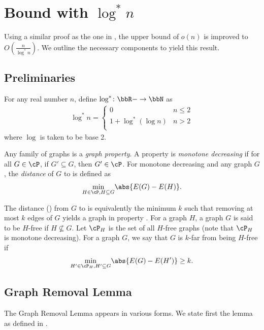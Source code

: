 \section{Bound with $\log^* n$}

Using a similar proof as the one in , the upper bound of $o(n)$ is improved to $O\left(\frac{n}{\log^* n}\right)$. We outline the necessary components to yield this result.

\subsection{Preliminaries}

\begin{definition}[$\log^* n$]\label{def:logstar}
	For any real number $n$, define $\log^*\colon \bbR -\rightarrow \bbN$ as
	\begin{align*}
		\log^*n = \begin{cases}
			0 & n \leq 2\\
			1 + \log^* (\log n) & n > 2\\
		\end{cases}
	\end{align*}
	where $\log$ is taken to be base 2.
\end{definition}

\begin{definition}
	Any family of graphs \cP is a {\em graph property}.
	A property \cP is {\em monotone decreasing} if for all $G \in \cP$, if $G' \subseteq G$, then $G' \in \cP$. For monotone decreasing \cP and any graph $G$, the {\em distance} of $G$ to \cP is defined as
	\begin{align*}
		\underset{H\in \cP, H\subseteq G}{\min}\abs{E(G)-E(H)}.
	\end{align*}
\end{definition}
The distance (\cite{Lee15}) from $G$ to \cP is equivalently the minimum $k$ such that removing at most $k$ edges of $G$ yields a graph in property \cP. For a graph $H$, a graph $G$ is said to be $H$-free if $H \not\subseteq G$. Let $\cP_H$ is the set of all $H$-free graphs (note that $\cP_H$ is monotone decreasing). For a graph $G$, we say that $G$ is $k$-far from being $H$-free if
\begin{align*}
	\underset{H'\in \cP_H, H'\subseteq G}{\min}\abs{E(G)-E(H')} \geq k.
\end{align*}

\subsection{Graph Removal Lemma~\cite{Lee15}}
The Graph Removal Lemma appears in various forms. We state first the lemma as defined in \cite{Lee15}.

